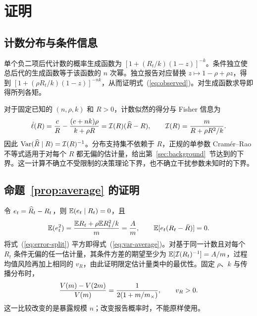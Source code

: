 \clearpage
\appendix
{}
\renewcommand{\theequation}{\thesection.\arabic{equation}}

\section{证明}
\label{app:proofs}

\subsection{计数分布与条件信息}
\label{app:model}
\label{app:target1}

单个负二项后代计数的概率生成函数为 $[1+(R_t/k)(1-z)]^{-k}$。条件独立使总后代的生成函数等于该函数的 $n$ 次幂。独立报告对应替换 $z\mapsto1-\rho+\rho z$，得到 $[1+(\rho R_t/k)(1-z)]^{-nk}$，从而证明式~(\ref{eq:observed})。对生成函数求导即得所列各矩。

对于固定已知的 $(n,\rho,k)$ 和 $R>0$，计数似然的得分与 Fisher 信息为
\begin{equation}
 \dot\ell(R)=\frac{c}{R}-\frac{(c+nk)\rho}{k+\rho R}
 =\mathcal I(R)(\widehat R-R),\qquad
 \mathcal I(R)=\frac{m}{R+\rho R^2/k}.
 \label{eq:score}
\end{equation}
因此 $\mathrm{Var}(\widehat R\mid R)=\mathcal I(R)^{-1}$。分布支持集不依赖于 $R$，正规的单参数 Cram\'er--Rao 不等式适用于对每个 $R$ 都无偏的估计量，给出第~\ref{sec:background}~节达到的下界\citep{lehmann1998theory}。这一计算不确立不受限制的决策理论下界，也不确立干扰参数未知时的下界。

\subsection{命题~\ref{prop:average} 的证明}
\label{app:prop1}

令 $e_t=\widehat R_t-R_t$，则 $\mathbb{E}(e_t\mid R_t)=0$，且
\begin{equation}
 \mathbb{E}(e_t^2)=\frac{\mathbb{E} R_t+\rho\mathbb{E} R_t^2/k}{m}=\frac{A}{m},
 \qquad \mathbb{E}[e_t(R_t-\bar R)]=0.
\end{equation}
将式~(\ref{eq:error-split}) 平方即得式~(\ref{eq:var-average})。对基于同一计数且对每个 $R_t$ 条件无偏的任一估计量，其条件方差的期望至少为 $\mathbb{E}[\mathcal I(R_t)^{-1}]=A/m$，过程均值风险再加上相同的 $v_R$，由此证明限定估计量类中的最优性。固定 $\rho$、$k$ 与传播分布时，
\begin{equation}
 \frac{V(m)-V(2m)}{V(m)}=\frac{1}{2(1+m/m_{\times})},\qquad v_R>0.
\end{equation}
这一比较改变的是暴露规模 $n$；改变报告概率时，不能原样使用。

